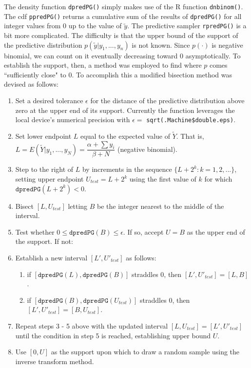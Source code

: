 \documentclass[12pt, a4paper]{article}
\begin{document}
\noindent The density function \texttt{dpredPG()} simply makes use of the R function \texttt{dnbinom()}.  The cdf \texttt{ppredPG()} returns a cumulative sum of the results of \texttt{dpredPG()} for all integer values from $0$ up to the value of $\tilde{y}$.  The predictive sampler \texttt{rpredPG()} is a bit more complicated. The difficulty is that the upper bound of the support of the predictive distribution $p(\tilde{y}|y_1,...,y_n)$ is not known.  Since $p(\cdot)$ is negative binomial, we can count on it eventually decreasing toward $0$ asymptotically.  To establish the support, then, a method was employed to find where $p$ comes ``sufficiently close" to $0$.  To accomplish this a modified bisection method was devised as follows:\\


    \begin{enumerate}
      \item Set a desired tolerance $\epsilon$ for the distance of the predictive distribution above zero at the upper end of its support.  Currently the function leverages the local device's numerical precision with $\epsilon = $ \texttt{sqrt(.Machine\$double.eps)}.
      \item Set lower endpoint $L$ equal to the expected value of $\tilde{Y}$.  That is, $L = E(\tilde{Y}|y_1,...,y_N) = \dfrac{\alpha+\sum{y_i}}{\beta+N}$ (negative binomial). %
      \item Step to the right of $L$ by increments in the sequence $\{L+2^k:k=1,2,...\}$, setting upper endpoint $U_{test} = L+2^k$ using the first value of $k$ for which $\texttt{dpredPG}\left(L + 2^k\right) < 0$.
      \item Bisect $[L,U_{test}]$ letting $B$ be the integer nearest to the middle of the interval.
      \item Test whether $0 \leq \texttt{dpredPG}(B) \leq \epsilon$.  If so, accept $U = B$ as the upper end of the support.  If not:
      \item Establish a new interval $[L',U'_{test}]$ as follows:
      \begin{enumerate}
        \item if $[\texttt{dpredPG}(L),\texttt{dpredPG}(B)]$ straddles $0$, then $[L',U'_{test}] = [L,B]$.
        \item if $[\texttt{dpredPG}(B),\texttt{dpredPG}(U_{test})]$ straddles $0$, then $[L',U'_{test}] = [B,U_{test}]$.
      \end{enumerate}
      \item Repeat steps 3 - 5 above with the updated interval $[L,U_{test}] = [L',U'_{test}]$ until the condition in step 5 is reached, establishing upper bound $U$.
      \item Use $[0,U]$ as the support upon which to draw a random sample using the inverse transform method.
    \end{enumerate}
\end{document}
